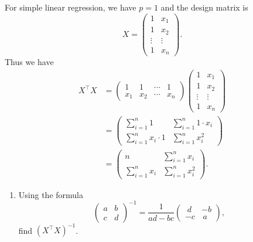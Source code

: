 \documentclass[
  a4paper,
]{article}
\providecommand{\tightlist}{%
  \setlength{\itemsep}{0pt}\setlength{\parskip}{0pt}}
\theoremstyle{definition}
\theoremstyle{definition}
\theoremstyle{definition}
\theoremstyle{definition}
\theoremstyle{remark}
\begin{document}
\begin{myanswers}
For simple linear regression, we have \(p=1\) and the design matrix is
\begin{equation*}
    X = \begin{pmatrix}
      1 & x_1 \\
      1 & x_2 \\
      \vdots & \vdots \\
      1 & x_n
    \end{pmatrix}.
  \end{equation*}
Thus we have
\begin{align*}
    X^\top X
    &= \begin{pmatrix}
        1 & 1 & \cdots & 1 \\
        x_1 & x_2 & \cdots & x_n
    \end{pmatrix} \begin{pmatrix}
      1 & x_1 \\
      1 & x_2 \\
      \vdots & \vdots \\
      1 & x_n
    \end{pmatrix} \\
    &= \begin{pmatrix}
      \sum_{i=1}^n 1 &  \sum_{i=1}^n 1 \cdot x_i \\
      \sum_{i=1}^n x_i \cdot 1 & \sum_{i=1}^n x_i^2
    \end{pmatrix} \\
    &= \begin{pmatrix}
      n & \sum_{i=1}^n x_i \\
      \sum_{i=1}^n x_i & \sum_{i=1}^n x_i^2
    \end{pmatrix}.
  \end{align*}

\end{myanswers}

\begin{enumerate}
\def\labelenumi{\alph{enumi}.}
\setcounter{enumi}{1}
\tightlist
\item
  Using the formula
  \begin{equation*}
   \begin{pmatrix} a & b \\ c & d \end{pmatrix}^{-1}
   = \frac{1}{ad-bc} \begin{pmatrix} \;d & -b \\ -c & \,a \end{pmatrix},
      \end{equation*}
  find \((X^\top X)^{-1}\).
\end{enumerate}
\end{document}
